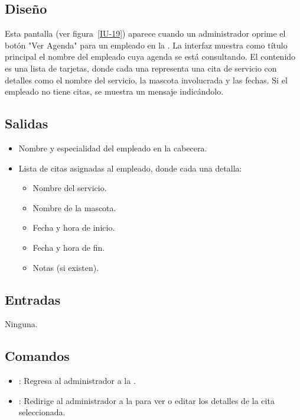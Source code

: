 \subsection{Diseño}
    Esta pantalla  (ver figura~\ref{IU-19}) aparece cuando un administrador oprime el botón "Ver Agenda" para un empleado en la . La interfaz muestra como título principal el nombre del empleado cuya agenda se está consultando. El contenido es una lista de tarjetas, donde cada una representa una cita de servicio con detalles como el nombre del servicio, la mascota involucrada y las fechas. Si el empleado no tiene citas, se muestra un mensaje indicándolo.


\subsection{Salidas}
\begin{itemize}
    \item Nombre y especialidad del empleado en la cabecera.
    \item Lista de citas asignadas al empleado, donde cada una detalla:
    \begin{itemize}
        \item Nombre del servicio.
        \item Nombre de la mascota.
        \item Fecha y hora de inicio.
        \item Fecha y hora de fin.
        \item Notas (si existen).
    \end{itemize}
\end{itemize}

\subsection{Entradas}
    Ninguna.

\subsection{Comandos}
\begin{itemize}
    \item {}: Regresa al administrador a la .
    \item {}: Redirige al administrador a la  para ver o editar los detalles de la cita seleccionada.
\end{itemize}

